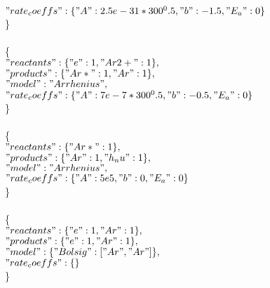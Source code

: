 \documentclass[11pt]{amsart}
\begin{document}
	$"rate_coeffs" : \{"A" : 2.5e-31*300^0.5,"b":-1.5,"E_a": 0\}$\\
\}\\
\\
\{\\
	$"reactants" : \{ "e" : 1, "Ar2+" : 1\},$\\
	$"products" : \{ "Ar*" : 1, "Ar" : 1\},$\\
	$"model" : "Arrhenius",	$\\
	$"rate_coeffs" : \{"A" : 7e-7*300^0.5,"b":-0.5,"E_a": 0\}$\\
\}\\
\\
\{\\
	$"reactants" : \{ "Ar*" : 1\},$\\
	$"products" : \{ "Ar" : 1, "h_nu" : 1\},$\\
	$"model" : "Arrhenius",$\\
	$"rate_coeffs" : \{"A" : 5e5,"b":0,"E_a": 0\}$\\
\}\\
\\
\{\\
	$"reactants" : \{ "e" : 1, "Ar" : 1\},$\\
	$"products" : \{ "e" : 1, "Ar" : 1\},$\\
	$"model" : \{"Bolsig": ["Ar", "Ar"]\},$\\
	$"rate_coeffs" : \{\}$\\
\}
\end{document}
